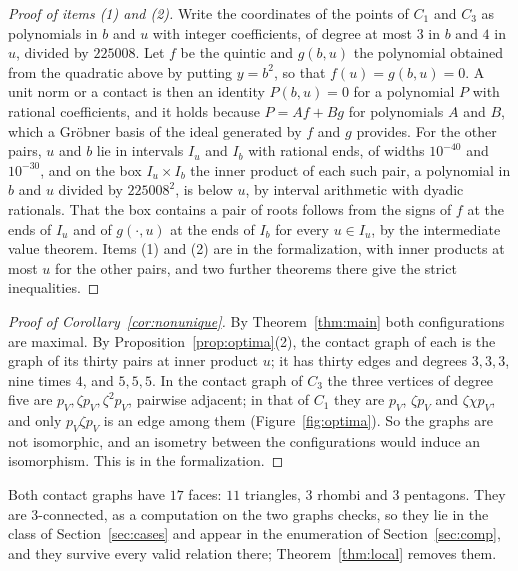\documentclass[12pt]{amsart}
\theoremstyle{definition}
\theoremstyle{plain}
\theoremstyle{definition}
\newcommand{\CI}{C_1}
\newcommand{\CIII}{C_3}
\begin{document}
\begin{proof}[Proof of items (1) and (2)]
Write the coordinates of the points of $\CI$ and $\CIII$ as polynomials in $b$ and $u$ with integer coefficients, of degree at most $3$ in $b$ and $4$ in $u$, divided by $225008$. Let $f$ be the quintic and $g(b,u)$ the polynomial obtained from the quadratic above by putting $y=b^2$, so that $f(u)=g(b,u)=0$. A unit norm or a contact is then an identity $P(b,u)=0$ for a polynomial $P$ with rational coefficients, and it holds because $P=Af+Bg$ for polynomials $A$ and $B$, which a Gr\"obner basis of the ideal generated by $f$ and $g$ provides. For the other pairs, $u$ and $b$ lie in intervals $I_u$ and $I_b$ with rational ends, of widths $10^{-40}$ and $10^{-30}$, and on the box $I_u\times I_b$ the inner product of each such pair, a polynomial in $b$ and $u$ divided by $225008^2$, is below $u$, by interval arithmetic with dyadic rationals. That the box contains a pair of roots follows from the signs of $f$ at the ends of $I_u$ and of $g(\cdot,u)$ at the ends of $I_b$ for every $u\in I_u$, by the intermediate value theorem. Items (1) and (2) are  in the formalization, with inner products at most $u$ for the other pairs, and two further theorems there give the strict inequalities.
\end{proof}

\begin{proof}[Proof of Corollary~\ref{cor:nonunique}]
By Theorem~\ref{thm:main} both configurations are maximal. By Proposition~\ref{prop:optima}(2), the contact graph of each is the graph of its thirty pairs at inner product $u$; it has thirty edges and degrees $3,3,3$, nine times $4$, and $5,5,5$. In the contact graph of $\CIII$ the three vertices of degree five are $p_V,\zeta p_V,\zeta^2p_V$, pairwise adjacent; in that of $\CI$ they are $p_V$, $\zeta p_V$ and $\zeta\chi p_V$, and only $p_V\zeta p_V$ is an edge among them (Figure~\ref{fig:optima}). So the graphs are not isomorphic, and an isometry between the configurations would induce an isomorphism. This is  in the formalization.
\end{proof}

Both contact graphs have $17$ faces: $11$ triangles, $3$ rhombi and $3$ pentagons. They are 3-connected, as a computation on the two graphs checks, so they lie in the class of Section~\ref{sec:cases} and appear in the enumeration of Section~\ref{sec:comp}, and they survive every valid relation there; Theorem~\ref{thm:local} removes them.
\end{document}

